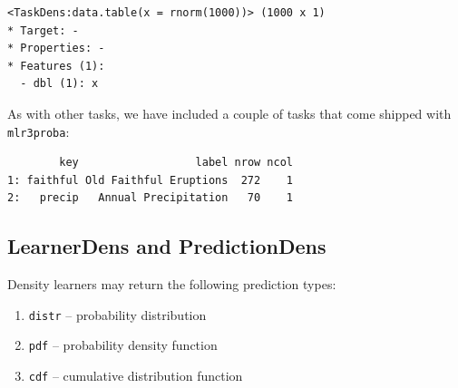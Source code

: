 \begin{Shaded}
\begin{Highlighting}[]
\OtherTok{=} \NormalTok{(}\NormalTok{(} \NormalTok{(}\NormalTok{)))}
\end{Highlighting}
\end{Shaded}

\begin{verbatim}
<TaskDens:data.table(x = rnorm(1000))> (1000 x 1)
* Target: -
* Properties: -
* Features (1):
  - dbl (1): x
\end{verbatim}

As with other tasks, we have included a couple of tasks that come
shipped with \texttt{mlr3proba}:

\begin{Shaded}
\begin{Highlighting}[]
\NormalTok{(mlr\_tasks)[task\_type }\SpecialCharTok{==} \NormalTok{, }\NormalTok{(}\SpecialCharTok{:}\NormalTok{, }\SpecialCharTok{:}\NormalTok{)]}
\end{Highlighting}
\end{Shaded}

\begin{verbatim}
        key                  label nrow ncol
1: faithful Old Faithful Eruptions  272    1
2:   precip   Annual Precipitation   70    1
\end{verbatim}

\hypertarget{learnerdens-and-predictiondens}{%
\subsection{LearnerDens and
PredictionDens}\label{learnerdens-and-predictiondens}}

Density learners may return the following prediction types:

\begin{enumerate}
\def\labelenumi{\arabic{enumi}.}
\tightlist
\item
  \texttt{distr} -- probability distribution
\item
  \texttt{pdf} -- probability density function
\item
  \texttt{cdf} -- cumulative distribution function
\end{enumerate}

